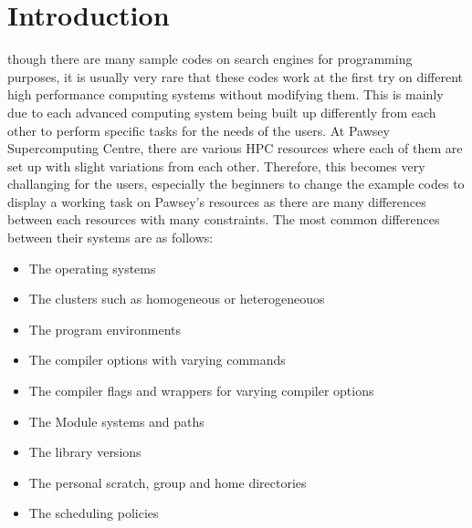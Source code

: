 
\section{Introduction}

 though there are many sample codes on search engines for programming purposes, it is usually very rare that these codes work at 
the first try on different high performance computing systems without modifying them. This is mainly due to each advanced computing system being built 
up differently from each other to perform specific tasks for the needs of the users. At Pawsey Supercomputing Centre, there are various HPC resources 
where each of them are set up with slight variations from each other. Therefore, this becomes very challanging for the users, especially the beginners 
to change the example codes to display a working task on Pawsey's resources as there are many differences between each resources with many constraints. 
The most common differences between their systems are as follows:

\begin{itemize}
\item The operating systems
\item The clusters such as homogeneous or heterogeneouos
\item The program environments
\item The compiler options with varying commands
\item The compiler flags and wrappers for varying compiler options
\item The Module systems and paths 
\item The library versions
\item The personal scratch, group and home directories
\item The scheduling policies
\end{itemize}

